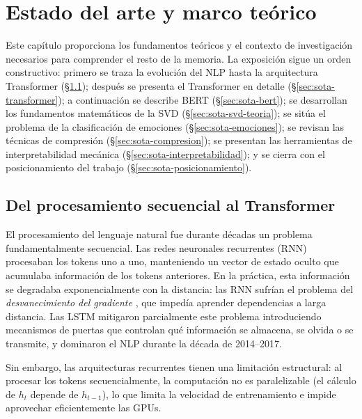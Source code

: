 
\section{Estado del arte y marco teórico}
\label{sec:estado-arte}

Este capítulo proporciona los fundamentos teóricos y el contexto de investigación
necesarios para comprender el resto de la memoria. La exposición sigue un orden
constructivo: primero se traza la evolución del NLP hasta la arquitectura Transformer
(\S\ref{sec:sota-historia}); después se presenta el Transformer en detalle
(\S\ref{sec:sota-transformer}); a continuación se describe BERT
(\S\ref{sec:sota-bert}); se desarrollan los fundamentos matemáticos de la SVD
(\S\ref{sec:sota-svd-teoria}); se sitúa el problema de la clasificación de emociones
(\S\ref{sec:sota-emociones}); se revisan las técnicas de compresión
(\S\ref{sec:sota-compresion}); se presentan las herramientas de interpretabilidad
mecánica (\S\ref{sec:sota-interpretabilidad}); y se cierra con el posicionamiento
del trabajo (\S\ref{sec:sota-posicionamiento}).

\subsection{Del procesamiento secuencial al Transformer}
\label{sec:sota-historia}

El procesamiento del lenguaje natural fue durante décadas un problema fundamentalmente
secuencial. Las redes neuronales recurrentes (RNN) \cite{elman1990finding} procesaban
los tokens uno a uno, manteniendo un vector de estado oculto que acumulaba información
de los tokens anteriores. En la práctica, esta información se degradaba
exponencialmente con la distancia: las RNN sufrían el problema del
\emph{desvanecimiento del gradiente} \cite{bengio1994learning}, que impedía aprender
dependencias a larga distancia. Las LSTM \cite{hochreiter1997long} mitigaron
parcialmente este problema introduciendo mecanismos de puertas que controlan qué
información se almacena, se olvida o se transmite, y dominaron el NLP durante la
década de 2014--2017.

Sin embargo, las arquitecturas recurrentes tienen una limitación estructural: al
procesar los tokens secuencialmente, la computación no es paralelizable (el cálculo
de $h_t$ depende de $h_{t-1}$), lo que limita la velocidad de entrenamiento e impide
aprovechar eficientemente las GPUs.

